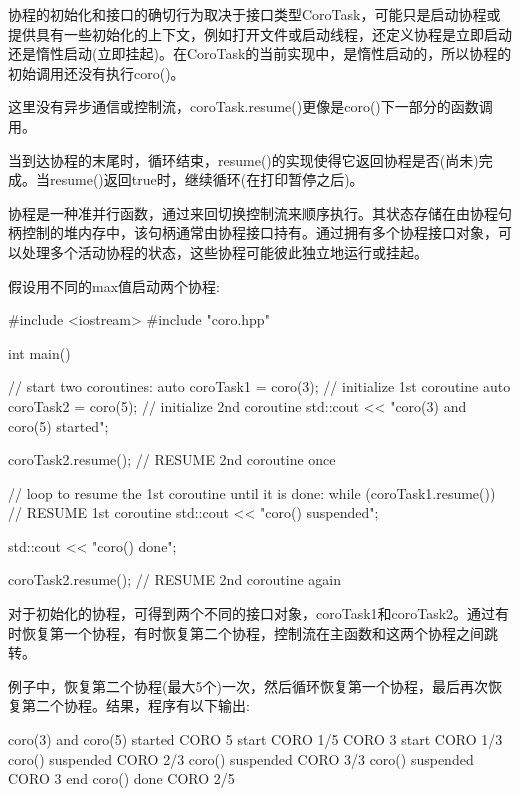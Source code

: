 协程的初始化和接口的确切行为取决于接口类型CoroTask，可能只是启动协程或提供具有一些初始化的上下文，例如打开文件或启动线程，还定义协程是立即启动还是惰性启动(立即挂起)。在CoroTask的当前实现中，是惰性启动的，所以协程的初始调用还没有执行coro()。

这里没有异步通信或控制流，coroTask.resume()更像是coro()下一部分的函数调用。

当到达协程的末尾时，循环结束，resume()的实现使得它返回协程是否(尚未)完成。当resume()返回true时，继续循环(在打印暂停之后)。


协程是一种准并行函数，通过来回切换控制流来顺序执行。其状态存储在由协程句柄控制的堆内存中，该句柄通常由协程接口持有。通过拥有多个协程接口对象，可以处理多个活动协程的状态，这些协程可能彼此独立地运行或挂起。

假设用不同的max值启动两个协程:


\begin{cpp}
#include <iostream>
#include "coro.hpp"

int main()
{
	// start two coroutines:
	auto coroTask1 = coro(3); // initialize 1st coroutine
	auto coroTask2 = coro(5); // initialize 2nd coroutine
	std::cout << "coro(3) and coro(5) started\n";

	coroTask2.resume(); // RESUME 2nd coroutine once

	// loop to resume the 1st coroutine until it is done:
	while (coroTask1.resume()) { // RESUME 1st coroutine
		std::cout << "coro() suspended\n";
	}

	std::cout << "coro() done\n";

	coroTask2.resume(); // RESUME 2nd coroutine again
}
\end{cpp}

对于初始化的协程，可得到两个不同的接口对象，coroTask1和coroTask2。通过有时恢复第一个协程，有时恢复第二个协程，控制流在主函数和这两个协程之间跳转。

例子中，恢复第二个协程(最大5个)一次，然后循环恢复第一个协程，最后再次恢复第二个协程。结果，程序有以下输出:

\begin{shell}
coro(3) and coro(5) started
         CORO 5 start
         CORO 1/5
         CORO 3 start
         CORO 1/3
coro() suspended
         CORO 2/3
coro() suspended
         CORO 3/3
coro() suspended
         CORO 3 end
coro() done
         CORO 2/5
\end{shell}

